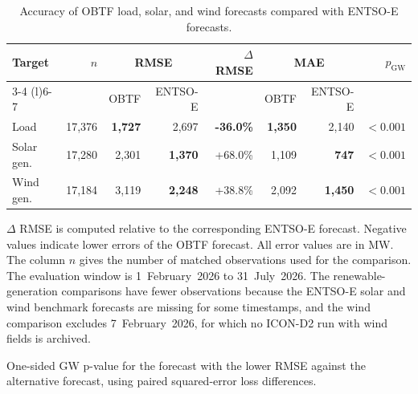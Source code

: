 \begin{table}[htbp]
  \centering
  \small
  \setlength{\tabcolsep}{4.2pt}
  \caption[Accuracy of the OBTF load, solar, and wind forecasts versus \mbox{ENTSO-E}.]
  {Accuracy of OBTF load, solar, and wind forecasts compared with
  \mbox{ENTSO-E} forecasts.}
  \label{tab:rq1_component_forecast_results}
  \begin{threeparttable}
  \begin{tabular}{@{}lrrrrrrr@{}}
    \toprule
    Target & \(n\) & \multicolumn{2}{c}{RMSE} &
    \(\Delta\) RMSE\tnote{a} & \multicolumn{2}{c}{MAE} &
    \(p_{\mathrm{GW}}\)\tnote{b} \\
    \cmidrule(lr){3-4} \cmidrule(l){6-7}
    & & OBTF & \mbox{ENTSO-E} & & OBTF & \mbox{ENTSO-E}
    \\
    \midrule
    Load & 17,376 & \textbf{1,727} & 2,697 & \textbf{-36.0\%}
      & \textbf{1,350} & 2,140 & \(<0.001\) \\
    Solar gen. & 17,280 & 2,301 & \textbf{1,370} & +68.0\%
      & 1,109 & \textbf{747} & \(<0.001\) \\
    Wind gen. & 17,184 & 3,119 & \textbf{2,248} & +38.8\%
      & 2,092 & \textbf{1,450} & \(<0.001\) \\
    \bottomrule
  \end{tabular}
  \begin{tablenotes}[flushleft]
    \footnotesize
    \item[a] \(\Delta\) RMSE is computed relative to the corresponding
    \mbox{ENTSO-E} forecast. Negative values indicate lower errors of the OBTF forecast. All error values are in MW. The column \(n\) gives the
    number of matched observations used for the comparison. The evaluation
    window is 1~February~2026 to 31~July~2026. The renewable-generation
    comparisons have fewer observations because the \mbox{ENTSO-E} solar and
    wind benchmark forecasts are missing for some timestamps, and the wind
    comparison excludes 7~February~2026, for which no \mbox{ICON-D2} run with
    wind fields is archived.
    \item[b] One-sided GW p-value for the forecast with the lower
    RMSE against the alternative forecast, using paired squared-error loss
    differences.
  \end{tablenotes}
  \end{threeparttable}
\end{table}

